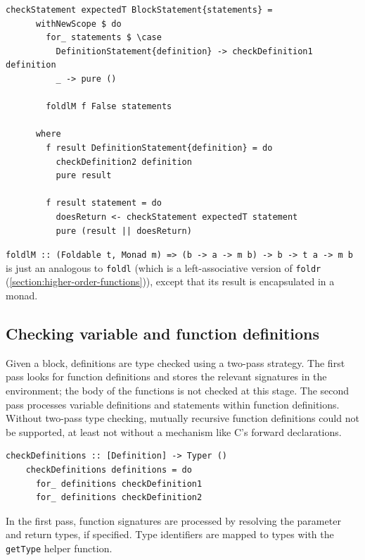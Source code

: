 \documentclass[UdineBachThesis,american,11pt]{PhdThesis}
\begin{document}
  \begin{Verbatim}[gobble=4,fontsize=\small]
    checkStatement expectedT BlockStatement{statements} =
      withNewScope $ do
        for_ statements $ \case
          DefinitionStatement{definition} -> checkDefinition1 definition
          _ -> pure ()

        foldlM f False statements

      where
        f result DefinitionStatement{definition} = do
          checkDefinition2 definition
          pure result

        f result statement = do
          doesReturn <- checkStatement expectedT statement
          pure (result || doesReturn)
  \end{Verbatim}

  \mbox{\texttt{foldlM :: (Foldable t, Monad m) => (b -> a -> m b) -> b -> t a -> m b}}
  is just an analogous to \mbox{\texttt{foldl}} (which is a left-associative
  version of \mbox{\texttt{foldr}} (\autoref{section:higher-order-functions})),
  except that its result is encapsulated in a monad.

  \subsection{Checking variable and function definitions}

  Given a block, definitions are type checked using a two-pass strategy. The
  first pass looks for function definitions and stores the relevant signatures
  in the environment; the body of the functions is not checked at this stage.
  The second pass processes variable definitions and statements within function
  definitions. Without two-pass type checking, mutually recursive function
  definitions could not be supported, at least not without a mechanism like C's
  forward declarations.

  \begin{Verbatim}[gobble=4,fontsize=\small]
    checkDefinitions :: [Definition] -> Typer ()
    checkDefinitions definitions = do
      for_ definitions checkDefinition1
      for_ definitions checkDefinition2
  \end{Verbatim}

  In the first pass, function signatures are processed by resolving the
  parameter and return types, if specified. Type identifiers are mapped to types
  with the \mbox{\texttt{getType}} helper function.
\end{document}
